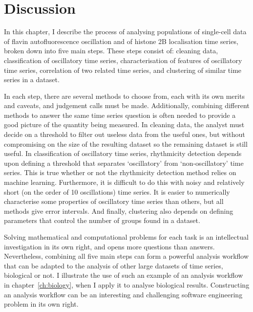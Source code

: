 \section{Discussion}
\label{sec:analysis-discussion}

In this chapter, I describe the process of analysing populations of single-cell data of flavin autofluorescence oscillation and of histone 2B localisation time series, broken down into five main steps.
These steps consist of: cleaning data, classification of oscillatory time series, characterisation of features of oscillatory time series, correlation of two related time series, and clustering of similar time series in a dataset.

In each step, there are several methods to choose from, each with its own merits and caveats, and judgement calls must be made.
Additionally, combining different methods to answer the same time series question is often needed to provide a good picture of the quantity being measured.
In cleaning data, the analyst must decide on a threshold to filter out useless data from the useful ones, but without compromising on the size of the resulting dataset so the remaining dataset is still useful.
In classification of oscillatory time series, rhythmicity detection depends upon defining a threshold that separates `oscillatory' from `non-oscillatory' time series.
This is true whether or not the rhythmicity detection method relies on machine learning.
Furthermore, it is difficult to do this with noisy and relatively short (on the order of 10 oscillations) time series.
It is easier to numerically characterise some properties of oscillatory time series than others, but all methods give error intervals.
And finally, clustering also depends on defining parameters that control the number of groups found in a dataset.

Solving mathematical and computational problems for each task is an intellectual investigation in its own right, and opens more questions than answers.
Nevertheless, combining all five main steps can form a powerful analysis workflow that can be adapted to the analysis of other large datasets of time series, biological or not.
I illustrate the use of such an example of an analysis workflow in chapter~\ref{ch:biology}, when I apply it to analyse biological results.
Constructing an analysis workflow can be an interesting and challenging software engineering problem in its own right.

